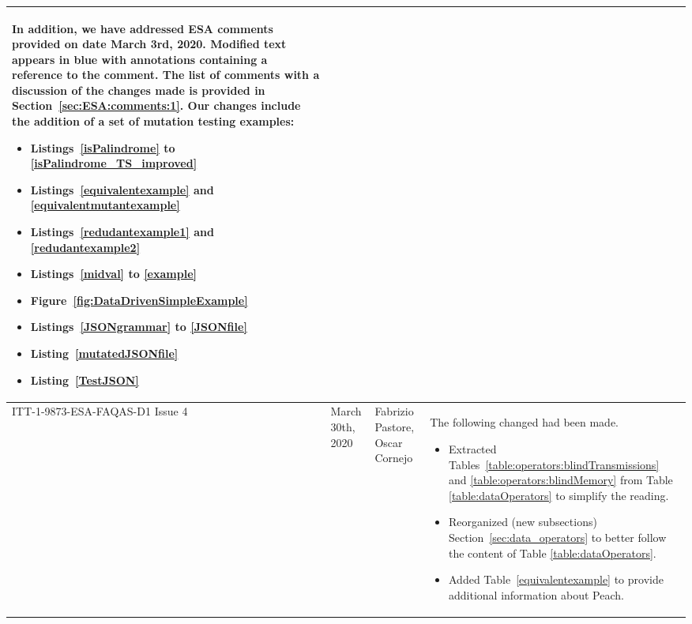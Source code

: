 \begin{longtable}{|p{2cm}|p{1cm}|p{1.5cm}|p{9cm}|@{}}
\begin{minipage}{8cm}
In addition, we have addressed ESA comments provided on date March 3rd, 2020. Modified text appears in blue with annotations containing a reference to the comment. The list of comments with a discussion of the changes made is provided in Section~\ref{sec:ESA:comments:1}. Our changes include the addition of a set of mutation testing examples:
\begin{itemize}
	\item Listings~\ref{isPalindrome} to \ref{isPalindrome_TS_improved}
	\item Listings~\ref{equivalentexample} and \ref{equivalentmutantexample}
	\item Listings~\ref{redudantexample1} and \ref{redudantexample2}	
	\item Listings~\ref{midval} to \ref{example}
	\item Figure~\ref{fig:DataDrivenSimpleExample}
	\item Listings~\ref{JSONgrammar} to \ref{JSONfile}
	\item Listing~\ref{mutatedJSONfile}
	\item Listing~\ref{TestJSON}
\end{itemize}

\end{minipage}

\\
\hline
ITT-1-9873-ESA-FAQAS-D1
Issue 4
&March 30th, 2020
&Fabrizio Pastore, Oscar Cornejo
&
\begin{minipage}{8cm}

The following changed had been made. 
\begin{itemize}
	\item Extracted Tables~\ref{table:operators:blindTransmissions} and \ref{table:operators:blindMemory} from Table \ref{table:dataOperators} to simplify the reading.
	\item Reorganized (new subsections) Section~\ref{sec:data_operators} to better follow the content of Table \ref{table:dataOperators}.
	\item Added Table~\ref{equivalentexample} to provide additional information about Peach.
\end{itemize}

\end{minipage}
\\



\end{longtable}
